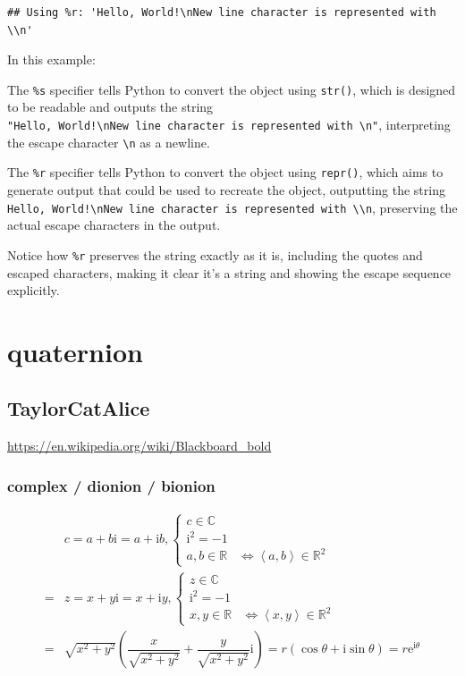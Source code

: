 \documentclass[
]{book}
\theoremstyle{definition}
\theoremstyle{definition}
\theoremstyle{definition}
\theoremstyle{definition}
\theoremstyle{remark}
\begin{document}
\begin{verbatim}
## Using %r: 'Hello, World!\nNew line character is represented with \\n'
\end{verbatim}

In this example:

The \texttt{\%s} specifier tells Python to convert the object using \texttt{str()}, which is designed to be readable and outputs the string \texttt{"Hello,\ World!\textbackslash{}nNew\ line\ character\ is\ represented\ with\ \textbackslash{}n"}, interpreting the escape character \texttt{\textbackslash{}n} as a newline.

The \texttt{\%r} specifier tells Python to convert the object using \texttt{repr()}, which aims to generate output that could be used to recreate the object, outputting the string \texttt{\textquotesingle{}Hello,\ World!\textbackslash{}nNew\ line\ character\ is\ represented\ with\ \textbackslash{}\textbackslash{}n\textquotesingle{}}, preserving the actual escape characters in the output.

Notice how \texttt{\%r} preserves the string exactly as it is, including the quotes and escaped characters, making it clear it's a string and showing the escape sequence explicitly.

\hypertarget{quaternion}{%
\chapter{quaternion}\label{quaternion}}

\hypertarget{taylorcatalice}{%
\section{TaylorCatAlice}\label{taylorcatalice}}

\url{https://en.wikipedia.org/wiki/Blackboard_bold}

\hypertarget{complex-dionion-bionion}{%
\subsection{complex / dionion / bionion}\label{complex-dionion-bionion}}

\[
\begin{aligned}
 & c=a+b\mathrm{i}=a+\mathrm{i}b,\begin{cases}
c\in\mathbb{C}\\
\mathrm{i}^{2}=-1\\
a,b\in\mathbb{R} & \Leftrightarrow\left\langle a,b\right\rangle \in\mathbb{R}^{2}
\end{cases}\\
= & z=x+y\mathrm{i}=x+\mathrm{i}y,\begin{cases}
z\in\mathbb{C}\\
\mathrm{i}^{2}=-1\\
x,y\in\mathbb{R} & \Leftrightarrow\left\langle x,y\right\rangle \in\mathbb{R}^{2}
\end{cases}\\
= & \sqrt{x^{2}+y^{2}}\left(\dfrac{x}{\sqrt{x^{2}+y^{2}}}+\dfrac{y}{\sqrt{x^{2}+y^{2}}}\mathrm{i}\right)=r\left(\cos\theta+\mathrm{i}\sin\theta\right)=r\mathrm{e}^{\mathrm{i}\theta}
\end{aligned}
\]
\end{document}
